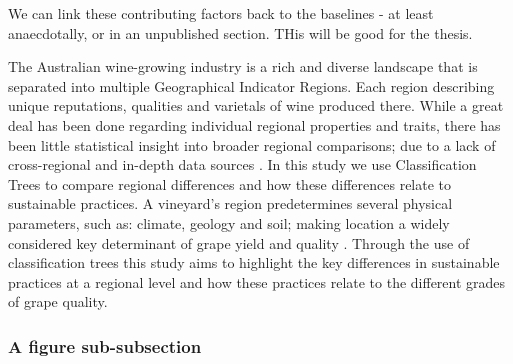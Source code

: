 \documentclass[review,12pt,authoryear]{elsarticle}
\begin{document}
\begin{linenumbers}
We can link these contributing factors back to the baselines - at least anaecdotally, or in an unpublished section. THis will be good for the thesis.

\fi

The Australian wine-growing industry is a rich and diverse landscape that is separated into multiple Geographical Indicator Regions. Each region describing unique reputations, qualities and varietals of wine produced there. While a great deal has been done regarding individual regional properties and traits, there has been little statistical insight into broader regional comparisons; due to a lack of cross-regional and in-depth data sources \autocite{keithjonesAustralianWineIndustry2002,knightFirmResourcesDevelopment2019}. In this study we use Classification Trees to compare regional differences and how these differences relate to sustainable practices. 
\newline
A vineyard's region predetermines several physical parameters, such as: climate, geology and soil; making location a widely considered key determinant of grape yield and quality \citep{abbalDecisionSupportSystem2016,agostaRegionalClimateVariability2012,fragaMultivariateClusteringViticultural2017}. 
%
%
Through the use of classification trees this study aims to highlight the key differences in sustainable practices at a regional level and how these practices relate to the different grades of grape quality.


\subsubsection{A figure sub-subsection}


\end{linenumbers}
\end{document}
